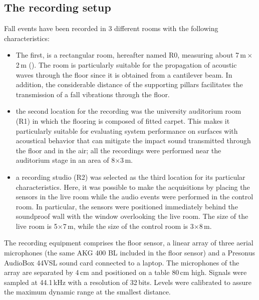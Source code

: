 \subsection{The recording setup}
Fall events have been recorded in 3 different rooms with the following characteristics:
\begin{itemize}
	\item The first, is a rectangular room, hereafter named R0, measuring about 7\,m\,$\times$\,2\,m (). The room is particularly suitable for the propagation of acoustic waves through the floor since it is obtained from a cantilever beam. In addition, the considerable distance of the supporting pillars facilitates the transmission of a fall vibrations through the floor.
	\item the second location for the recording was the university auditorium room (R1) in which the flooring is composed of fitted carpet. This makes it particularly suitable for evaluating system performance on surfaces with acoustical behavior that can mitigate the impact sound transmitted through the floor and in the air; all the recordings were performed near the auditorium stage in an area of 8$\times$3\,m.
	\item a recording studio (R2) was selected as the third location for its particular characteristics. Here, it was possible to make the acquisitions by placing the sensors in the live room while the audio events were performed in the control room. In particular, the sensors were positioned immediately behind the soundproof wall with the window overlooking the live room. The size of the live room is 5$\times$7\,m, while the size of the control room is 3$\times$8\,m.
\end{itemize}

  The recording equipment comprises the floor sensor, a linear array of three aerial microphones (the same AKG 400 BL included in the floor sensor) and a Presonus AudioBox 44VSL sound card connected to a laptop. The microphones of the array are separated by 4\,cm and positioned on a table 80\,cm high. Signals were sampled at 44.1\,kHz with a resolution of 32\,bits. Levels were calibrated to assure the maximum dynamic range at the smallest distance.


